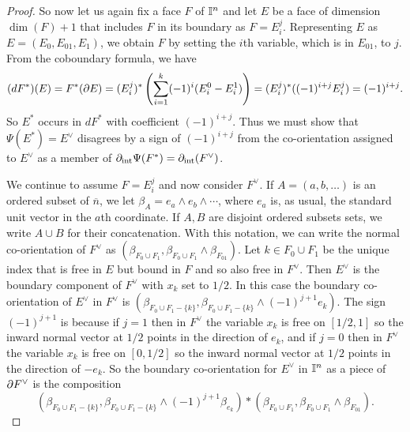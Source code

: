 \begin{proof}
	So now let us again fix a face $F$ of $\mathbb{I}^n$ and let $E$ be a face of dimension $\dim(F)+1$ that includes $F$ in its boundary as $F = E_i^j$.
	Representing $E$ as $E = (E_0,E_{01},E_1)$, we obtain $F$ by setting the $i$th variable, which is in $E_{01}$, to $j$.
	From the coboundary formula, we have
	\begin{equation*}
		(dF^*)(E) = F^*(\partial E) = (E_i^j)^*\left(\sum_{i = 1}^k (-1)^i(E_i^0-E^1_i)\right)
		= (E_i^j)^*((-1)^{i+j}E_i^j) = (-1)^{i+j}.
	\end{equation*}
	So 	$E^*$ occurs in $dF^*$ with coefficient $(-1)^{i+j}$.
	Thus we must show that $\Psi(E^*) = E^\vee$ disagrees by a sign of $(-1)^{i+j}$ from the co-orientation assigned to $E^\vee$ as a member of $\partial_{\text{int}} \Psi(F^*) = \partial_{\text{int}} (F^\vee)$.

	We continue to assume $F = E_i^j$ and now consider $F^\vee$.
	If $A=(a,b,\ldots)$ is an ordered subset of $\overline{n}$, we let $\beta_A = e_a \wedge e_b \wedge \cdots$, where $e_a$ is, as usual, the standard unit vector in the $a$th coordinate.
	If $A, B$ are disjoint ordered subsets sets, we write $A \cup B$ for their concatenation.
	With this notation, we can write the normal co-orientation of $F^\vee$ as $(\beta_{F_0 \cup F_1},\beta_{F_0 \cup F_1} \wedge \beta_{F_{01}})$.
	Let $k \in F_0 \cup F_1$ be the unique index that is free in $E$ but bound in $F$ and so also free in $F^\vee$.
	Then $E^\vee$ is the boundary component of $F^\vee$ with $x_k$ set to $1/2$.
	In this case the boundary co-orientation of $E^\vee$ in $F^\vee$ is $(\beta_{F_0 \cup F_1 - \{k\}},\beta_{F_0 \cup F_1 - \{k\}} \wedge (-1)^{j+1} e_k)$.
	The sign $(-1)^{j+1}$ is because if $j = 1$ then in $F^\vee$ the variable $x_k$ is free on $[1/2,1]$ so the inward normal vector at $1/2$ points in the direction of $e_k$, and if $j = 0$ then in $F^\vee$ the variable $x_k$ is free on $[0,1/2]$ so the inward normal vector at $1/2$ points in the direction of $-e_k$.
	So the boundary co-orientation for $E^\vee$ in $\mathbb{I}^n$ as a piece of $\partial F^\vee$ is the composition $$(\beta_{F_0 \cup F_1 - \{k\}},\beta_{F_0 \cup F_1 - \{k\}} \wedge (-1)^{j+1} \beta_{e_k})*(\beta_{F_0 \cup F_1},\beta_{F_0 \cup F_1} \wedge \beta_{F_{01}}).$$


\end{proof}
